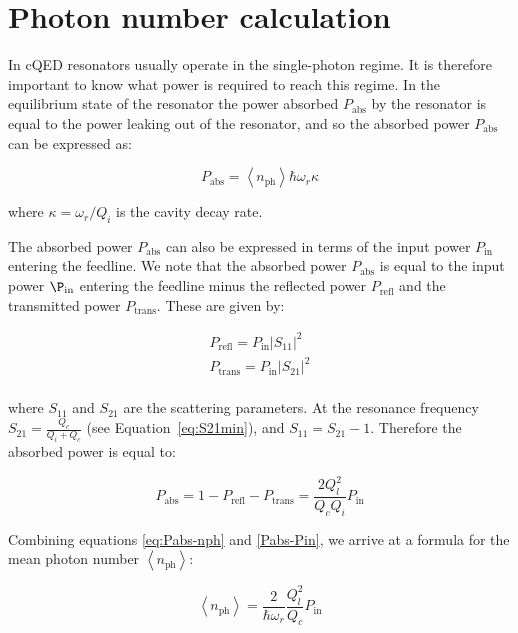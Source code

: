 


\chapter{Photon number calculation}
  \label{ch:photon number calculation}

  In cQED resonators usually operate in the single-photon regime. It is therefore important to know what power is required to reach this regime. In the equilibrium state of the resonator the power absorbed $P_\text{abs}$ by the resonator is equal to the power leaking out of the resonator, and so the absorbed power $P_\text{abs}$ can be expressed as:

  \begin{equation}
    P_\text{abs} = \left<n_\text{ph}\right>\hbar\omega_r \kappa
    \label{eq:Pabs-nph}
  \end{equation}

  where $\kappa=\omega_r/Q_i$ is the cavity decay rate.

  The absorbed power $P_\text{abs}$ can also be expressed in terms of the input power $P_\text{in}$ entering the feedline. We note that the absorbed power $P_\text{abs}$ is equal to the input power $\P_\text{in}$ entering the feedline minus the reflected power $P_\text{refl}$ and the transmitted power $P_\text{trans}$. These are given by:

  \begin{align}
    P_\text{refl} = P_\text{in}\left|S_{11}\right|^2\\
    P_\text{trans} = P_\text{in}\left|S_{21}\right|^2\\
  \end{align}

  where $S_{11}$ and $S_{21}$ are the scattering parameters. At the resonance frequency $S_{21}=\frac{Q_c}{Q_i+Q_c}$ (see Equation~\ref{eq:S21min}), and $S_{11}=S_{21}-1$. Therefore the absorbed power is equal to:

  \begin{equation}
    P_\text{abs}=1-P_\text{refl}-P_\text{trans}=\frac{2Q_l^2}{Q_c Q_i}P_\text{in}
    \label{Pabs-Pin}
  \end{equation}

  Combining equations \ref{eq:Pabs-nph} and \ref{Pabs-Pin}, we arrive at a formula for the mean photon number $\left<n_\text{ph}\right>$:

  \begin{equation}
    \left<n_\text{ph}\right> = \frac{2}{\hbar \omega_r}\frac{Q_l^2}{Q_c}P_\text{in}
  \end{equation}

